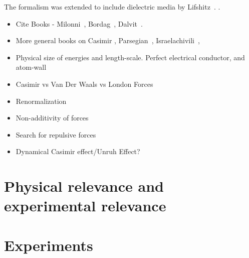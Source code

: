 The formalism was extended to include dielectric media by Lifshitz~\cite{Lifshitz1956}.  .  





\begin{itemize}
\item Cite Books - Milonni~\cite{Milonnibook1994}, Bordag~\cite{Bordagbook2009}, Dalvit~\cite{Dalvitbook2011}.
\item More general books on Casimir , Parsegian~\cite{Parsegian2006}, Israelachivili~\cite{Israelachvili2011}, 
\item Physical size of energies and length-scale.  Perfect electrical conductor, and atom-wall
\item Casimir vs Van Der Waals vs London Forces
\item Renormalization
\item Non-additivity of forces
\item Search for repulsive forces
\item Dynamical Casimir effect/Unruh Effect?
\end{itemize}

\section{Physical relevance and experimental relevance}

\section{Experiments}
